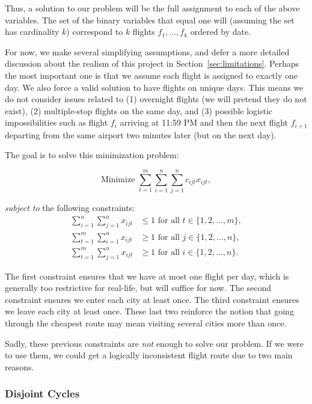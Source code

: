 \documentclass{article}
\begin{document}
Thus, a solution to our problem will be the full assignment to each of the above variables. The set of the binary variables that equal one will
(assuming the set has cardinality $k$) correspond to $k$ flights $f_1, \ldots, f_k$ ordered by date.

For now, we make several simplifying assumptions, and defer a more detailed discussion about the realism of this project in
Section~\ref{sec:limitations}. Perhaps the most important one is that we assume each flight is assigned to exactly one day. We also force a valid
solution to have flights on unique days. This means we do not consider issues related to (1) overnight flights (we will pretend they do not exist),
(2) multiple-stop flights on the same day, and (3) possible logistic impossibilities such as flight $f_i$ arriving at 11:59 PM and then the next
flight $f_{i+1}$ departing from the same airport two minutes later (but on the next day).

The goal is to solve this minimization problem:

\begin{equation}
\mbox{Minimize } \sum_{t=1}^{m} \sum_{i=1}^{n} \sum_{j=1}^{n} c_{ijt}x_{ijt},
\end{equation}

\emph{subject to} the following constraints:
\begin{align}
\sum_{i=1}^{n} \sum_{j=1}^{n} x_{ijt} &\le 1 \mbox{ for all } t \in \{1, 2, \ldots, m\}, \\ 
\sum_{t=1}^{m} \sum_{i=1}^{n} x_{ijt} &\ge 1 \mbox{ for all } j \in \{1, 2, \ldots, n\}, \\
\sum_{t=1}^{m} \sum_{j=1}^{n} x_{ijt} &\ge 1 \mbox{ for all } i \in \{1, 2, \ldots, n\}.
\end{align}

The first constraint ensures that we have at most one flight per day, which is generally too restrictive for real-life, but will suffice for now. The
second constraint ensures we enter each city at least once. The third constraint ensures we leave each city at least once. These last two reinforce
the notion that going through the cheapest route may mean visiting several cities more than once.

Sadly, these previous constraints are \emph{not} enough to solve our problem. If we were to use them, we could get a logically inconsistent flight
route due to two main reasons.

\subsubsection{Disjoint Cycles}\label{sec:disjoint_cycles}
\end{document}
